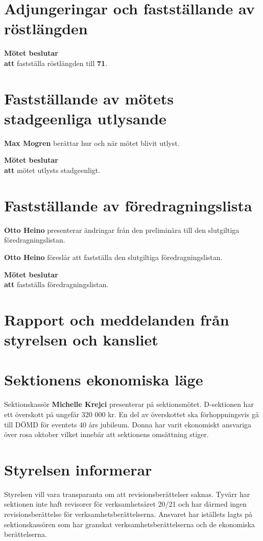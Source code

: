 \documentclass{datateknologsektionen-document}
\newcommand{\ind}{\hspace*{2em}}
\newcommand{\motetbeslutar}{\textbf{Mötet beslutar}}
\newcommand{\att}{\\\ind\textbf{att}}
\begin{document}
\section{Adjungeringar och fastställande av röstlängden}
\motetbeslutar
\att{} fastställa röstlängden till \textbf{71}.





\section{Fastställande av mötets stadgeenliga utlysande}
\textbf{Max Mogren} berättar hur och när mötet blivit utlyst.

\motetbeslutar
\att{} mötet utlysts stadgeenligt.



\pagebreak
\section{Fastställande av föredragningslista}
\textbf{Otto Heino} presenterar ändringar från den preliminära till den slutgiltiga föredragningslistan.

\textbf{Otto Heino} föreslår att fastställa den slutgiltiga föredragningslistan.

\motetbeslutar\att{} fastställa föredragningslistan.


\section{Rapport och meddelanden från styrelsen och kansliet}



\pagebreak
\section{Sektionens ekonomiska läge}
Sektionskassör \textbf{Michelle Krejci} presenterar på sektionsmötet.
D-sektionen har ett överskott på ungefär 320 000 kr. En del av överskottet ska förhoppningsvis gå till DÖMD för eventets 40 års jubileum. Donna har varit ekonomiskt ansvariga över rosa oktober vilket innebär att sektionens omsättning stiger.


\section{Styrelsen informerar}
Styrelsen vill vara transparanta om att revisionsberättelser saknas. Tyvärr har sektionen inte haft revisorer för verksamhetsåret 20/21 och har därmed ingen revisionsberättelse för verksamhetsberättelserna. Ansvaret har iställets lagts på sektionskassören som har granskat verksamhetsberättelserna och de ekonomiska berättelserna. 
\end{document}
